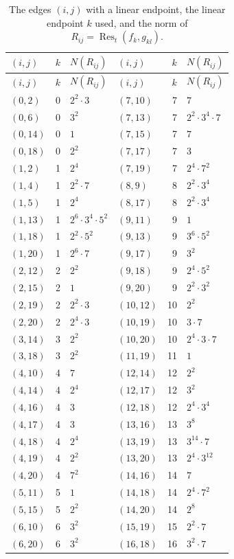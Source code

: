 \documentclass[11pt]{article}
\begin{document}
\begingroup\small
\setlength{\LTcapwidth}{\textwidth}
\begin{longtable}{@{}lrl@{\qquad}lrl@{}}
\caption{The edges $(i,j)$ with a linear endpoint, the linear endpoint $k$ used, and the norm of $R_{ij}=\operatorname{Res}_t(f_k,g_{kl})$.}\label{tab:sep}\\
\hline $(i,j)$ & $k$ & $N(R_{ij})$ & $(i,j)$ & $k$ & $N(R_{ij})$\\\hline\endfirsthead\hline $(i,j)$ & $k$ & $N(R_{ij})$ & $(i,j)$ & $k$ & $N(R_{ij})$\\\hline\endhead\hline\endfoot
$(0,2)$ & 0 & $2^{2}\cdot 3$ & $(7,10)$ & 7 & $7$\\
$(0,6)$ & 0 & $3^{2}$ & $(7,13)$ & 7 & $2^{2}\cdot 3^{4}\cdot 7$\\
$(0,14)$ & 0 & $1$ & $(7,15)$ & 7 & $7$\\
$(0,18)$ & 0 & $2^{2}$ & $(7,17)$ & 7 & $3$\\
$(1,2)$ & 1 & $2^{4}$ & $(7,19)$ & 7 & $2^{4}\cdot 7^{2}$\\
$(1,4)$ & 1 & $2^{2}\cdot 7$ & $(8,9)$ & 8 & $2^{2}\cdot 3^{4}$\\
$(1,5)$ & 1 & $2^{4}$ & $(8,17)$ & 8 & $2^{2}\cdot 3^{4}$\\
$(1,13)$ & 1 & $2^{6}\cdot 3^{4}\cdot 5^{2}$ & $(9,11)$ & 9 & $1$\\
$(1,18)$ & 1 & $2^{2}\cdot 5^{2}$ & $(9,13)$ & 9 & $3^{6}\cdot 5^{2}$\\
$(1,20)$ & 1 & $2^{6}\cdot 7$ & $(9,17)$ & 9 & $3^{2}$\\
$(2,12)$ & 2 & $2^{2}$ & $(9,18)$ & 9 & $2^{4}\cdot 5^{2}$\\
$(2,15)$ & 2 & $1$ & $(9,20)$ & 9 & $2^{2}\cdot 3^{2}$\\
$(2,19)$ & 2 & $2^{2}\cdot 3$ & $(10,12)$ & 10 & $2^{2}$\\
$(2,20)$ & 2 & $2^{4}\cdot 3$ & $(10,19)$ & 10 & $3\cdot 7$\\
$(3,14)$ & 3 & $2^{2}$ & $(10,20)$ & 10 & $2^{4}\cdot 3\cdot 7$\\
$(3,18)$ & 3 & $2^{2}$ & $(11,19)$ & 11 & $1$\\
$(4,10)$ & 4 & $7$ & $(12,14)$ & 12 & $2^{2}$\\
$(4,14)$ & 4 & $2^{4}$ & $(12,17)$ & 12 & $3^{2}$\\
$(4,16)$ & 4 & $3$ & $(12,18)$ & 12 & $2^{4}\cdot 3^{4}$\\
$(4,17)$ & 4 & $3$ & $(13,16)$ & 13 & $3^{8}$\\
$(4,18)$ & 4 & $2^{4}$ & $(13,19)$ & 13 & $3^{14}\cdot 7$\\
$(4,19)$ & 4 & $2^{2}$ & $(13,20)$ & 13 & $2^{4}\cdot 3^{12}$\\
$(4,20)$ & 4 & $7^{2}$ & $(14,16)$ & 14 & $7$\\
$(5,11)$ & 5 & $1$ & $(14,18)$ & 14 & $2^{4}\cdot 7^{2}$\\
$(5,15)$ & 5 & $2^{2}$ & $(14,20)$ & 14 & $2^{8}$\\
$(6,10)$ & 6 & $3^{2}$ & $(15,19)$ & 15 & $2^{2}\cdot 7$\\
$(6,20)$ & 6 & $3^{2}$ & $(16,18)$ & 16 & $3^{2}\cdot 7$\\
\end{longtable}
\endgroup
\end{document}
